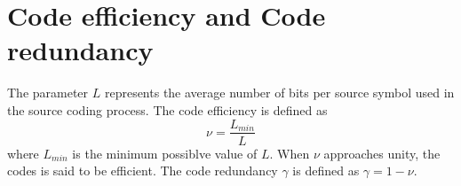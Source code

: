 

\section{Code efficiency and Code redundancy}
The parameter $L$ represents the average number of bits per source symbol used in the source coding process.
The code efficiency is defined as \[\nu = \frac{L_{min}}{ L} \]where $L_{min}$ is the minimum possiblve value of $L$. When $\nu$ approaches unity, the codes is said to be efficient. 
The code redundancy $\gamma$ is defined as $\gamma = 1- \nu$.



